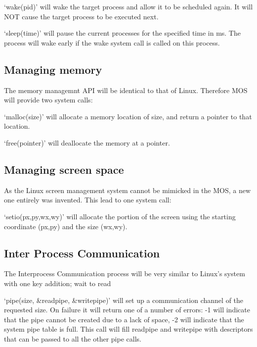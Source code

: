 \documentclass[a4paper]{report}
\begin{document}
\vspace{1.5mm}
\noindent
`wake(pid)' will wake the target process and allow it to be scheduled again. It will NOT cause the target process to be executed next.

\vspace{1.5mm}
\noindent
`sleep(time)' will pause the current processes for the specified time in ms. The process will wake early if the wake system call is called on this process.

\subsection{Managing memory}

The memory managemnt API will be identical to that of Linux. Therefore MOS will provide two system calls:

\vspace{1.5mm}
\noindent
`malloc(size)' will allocate a memory location of size, and return a pointer to that location.

\vspace{1.5mm}
\noindent
`free(pointer)' will deallocate the memory at a pointer.

\subsection{Managing screen space}

As the Linux screen management system cannot be mimicked in the MOS, a new one entirely was invented. This lead to one system call:

\vspace{1.5mm}
\noindent
`setio(px,py,wx,wy)' will allocate the portion of the screen using the starting coordinate (px,py) and the size (wx,wy).


\subsection{Inter Process Communication}

The Interprocess Communication process will be very similar to Linux's system with one key addition; wait to read

\vspace{1.5mm}
\noindent
`pipe(size, \&readpipe, \&writepipe)' will set up a communication channel of the requested size. On failure it will return one of a number of errors: -1 will indicate that the pipe cannot be created due to a lack of space, -2 will indicate that the system pipe table is full. This call will fill readpipe and writepipe with descriptors that can be passed to all the other pipe calls.
\end{document}
